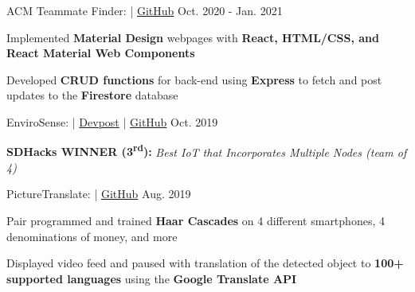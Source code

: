 

\begin{cventries}
	\cvproject
	{ACM Teammate Finder:  | \href{https://github.com/LelandTLong/ACM_Project}{\textcolor{awesome-skyblue}{\faGithub \enspace GitHub}}}
	{Oct. 2020 - Jan. 2021}
	{
		\begin{cvitems}
			\item Implemented \textbf{Material Design} webpages with \textbf{React, HTML/CSS, and React Material Web Components}
			\item Developed \textbf{CRUD functions} for back-end using \textbf{Express} to fetch and post updates to the \textbf{Firestore} database
		\end{cvitems}
	}

	\cvproject
	{EnviroSense:  | \href{https://devpost.com/software/envirosense}{\textcolor{awesome-skyblue}{Devpost}} | \href{https://github.com/jerukan/EnviroSense}{\textcolor{awesome-skyblue}{\faGithub \enspace GitHub}}}
	{Oct. 2019}
	{
		\begin{cvitems}
			\item \textbf{SDHacks WINNER (3\textsuperscript{rd}):} \textit{Best IoT that Incorporates Multiple Nodes (team of 4)}
		\end{cvitems}
	}

	\cvproject
	{PictureTranslate:  |  \href{https://github.com/ucsd-cse-spis-2019/project-tristin-caroline}{\textcolor{awesome-skyblue}{\faGithub \enspace GitHub}}}
	{Aug. 2019}
	{
		\begin{cvitems}
			\item Pair programmed and trained \textbf{Haar Cascades} on 4 different smartphones, 4 denominations of money, and more
			\item Displayed video feed and paused with translation of the detected object to \textbf{100+ supported languages} using the \textbf{Google Translate API}
		\end{cvitems}
	}
\end{cventries}